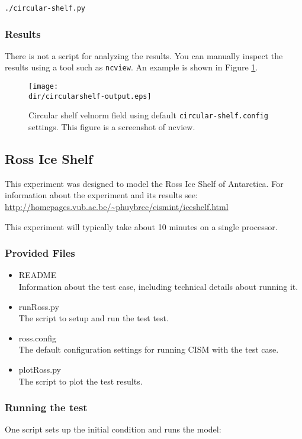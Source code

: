 \texttt{./circular-shelf.py}

\subsubsection{Results}
There is not a script for analyzing the results.
You can manually inspect the results using a tool such as \texttt{ncview}.
An example is shown in Figure \ref{fig:circularshelf-results}.

\begin{figure}[H!]
	\centering
	\texttt{[image: \\dir/circularshelf-output.eps]}
	\caption{Circular shelf velnorm field using default \texttt{circular-shelf.config} settings. This figure is a screenshot of ncview.}
	\label{fig:circularshelf-results}
\end{figure}
\FloatBarrier

\subsection{Ross Ice Shelf}
This experiment was designed to model the Ross Ice Shelf of Antarctica.
For information about the experiment and its results see:
\url{http://homepages.vub.ac.be/~phuybrec/eismint/iceshelf.html}

This experiment will typically take about 10 minutes on a single processor.

\subsubsection{Provided Files}

\begin{itemize}
	\item README \\
		Information about the test case, including technical details about running it.
	\item runRoss.py \\
		The script to setup and run the test test.
	\item ross.config \\
  The default configuration settings for running CISM with the test case.
	\item plotRoss.py \\
		The script to plot the test results.
\end{itemize}

\subsubsection{Running the test}
One script sets up the initial condition and runs the model:

